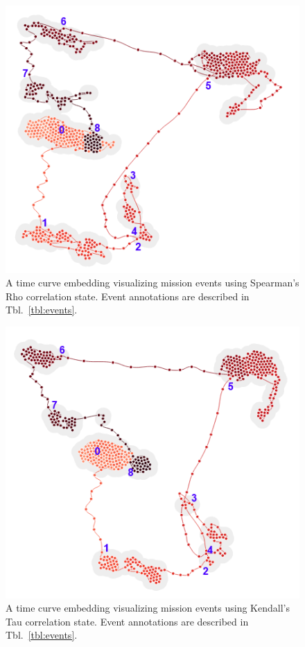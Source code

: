 \begin{figure}[h]
\centering
    \includegraphics{images/pfm2_rho_time_curve_annotated.png}
    \caption{A time curve embedding visualizing mission events using Spearman's Rho correlation state. Event annotations are described in Tbl.~\ref{tbl:events}.}
    \label{fig:pfm2_rho_time_curve_annotated}
\end{figure}

\begin{figure}[h]
\centering
    \includegraphics{images/pfm2_tau_time_curve_annotated.png}
    \caption{A time curve embedding visualizing mission events using Kendall's Tau correlation state. Event annotations are described in Tbl.~\ref{tbl:events}.}
    \label{fig:pfm2_tau_time_curve_annotated}
\end{figure}